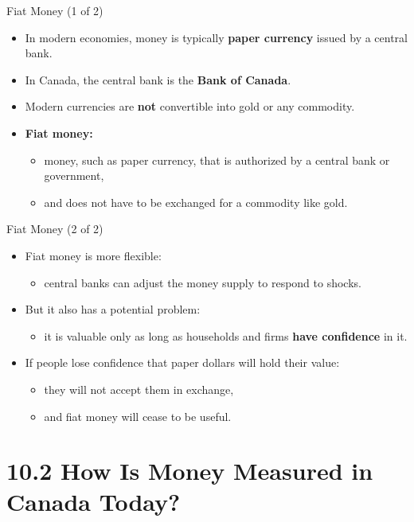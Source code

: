 \documentclass[aspectratio=169]{beamer}
\begin{document}
\begin{frame}{Fiat Money (1 of 2)}
\transfade
\begin{itemize}[<+->]
  \item In modern economies, money is typically \textbf{paper currency} issued by a \alert{central bank}.
  \item In Canada, the central bank is the \textbf{Bank of Canada}.
  \item Modern currencies are \textbf{not} convertible into gold or any commodity.
  \item \textbf{Fiat money:}
  \begin{itemize}[<+->]
    \item money, such as paper currency, that is authorized by a central bank or government,
    \item and does not have to be exchanged for a commodity like gold.
  \end{itemize}
\end{itemize}
\end{frame}

\begin{frame}{Fiat Money (2 of 2)}
\transfade
\begin{itemize}[<+->]
  \item Fiat money is more \alert{flexible}:
  \begin{itemize}[<+->]
    \item central banks can adjust the money supply to respond to shocks.
  \end{itemize}
  \item But it also has a potential problem:
  \begin{itemize}[<+->]
    \item it is valuable only as long as households and firms \textbf{have confidence} in it.
  \end{itemize}
  \item If people lose confidence that paper dollars will hold their value:
  \begin{itemize}[<+->]
    \item they will not accept them in exchange,
    \item and fiat money will cease to be useful.
  \end{itemize}
\end{itemize}
\end{frame}

\section{10.2 How Is Money Measured in Canada Today?}
\end{document}
